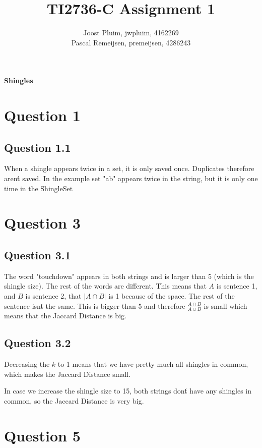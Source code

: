 \documentclass[11pt,twoside,a4paper]{article}
\title{TI2736-C Assignment 1}
\author{
	Joost Pluim, jwpluim, 4162269 \\
	Pascal Remeijsen, premeijsen, 4286243
}
\begin{document}
\maketitle
\clearpage

\textbf{Shingles}

\section{Question 1}
	
	\subsection{Question 1.1}
	
		When a shingle appears twice in a set, it is only saved once. Duplicates therefore aren\'t saved. In the example set "ab" appears twice in the string, but it is only one time in the ShingleSet
		
\section{Question 3}

	\subsection{Question 3.1}
	
		The word "touchdown" appears in both strings and is larger than 5 (which is the shingle size). The rest of the words are different. This means that $A$ is sentence 1, and $B$ is sentence 2, that $|A \cap B|$ is 1 because of the space. The rest of the sentence isn\'t the same. This is bigger than 5 and therefore $\frac{A \cap B}{A \cup B}$ is small which means that the Jaccard Distance is big. 
		
	\subsection{Question 3.2}
		Decreasing the $k$ to 1 means that we have pretty much all shingles in common, which makes the Jaccard Distance small. 
		
		In case we increase the shingle size to 15, both strings don\'t have any shingles in common, so the Jaccard Distance is very big.
		
\section{Question 5}
\end{document}
